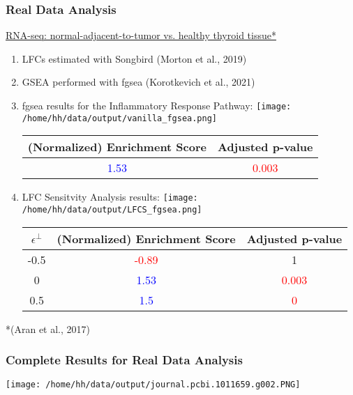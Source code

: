 \documentclass[11pt,t]{beamer}
\begin{document}
\begin{frame}
  \frametitle{Real Data Analysis}

  \underline{RNA-seq: normal-adjacent-to-tumor vs. healthy thyroid tissue*}
  \begin{enumerate}
    \item LFCs estimated with Songbird (Morton et al., 2019)
    \item GSEA performed with fgsea (Korotkevich et al., 2021)
  

  \pause

  \item fgsea results for the Inflammatory Response Pathway:
  \texttt{[image: /home/hh/data/output/vanilla\_fgsea.png]}
    \begin{center}
    \begin{tabular}{ |c|c| }
    \hline
    (Normalized) Enrichment Score & Adjusted p-value \\
    \hline
    \textcolor{blue}{1.53} & \textcolor{red}{0.003}  \\
    \hline
    \end{tabular}
    \end{center}
 
  \pause
  \item LFC Sensitvity Analysis results:
  \texttt{[image: /home/hh/data/output/LFCS\_fgsea.png]}
    \begin{center}
    \begin{tabular}{ |c|c|c| }
    \hline
    \(\epsilon^\perp\) & (Normalized) Enrichment Score & Adjusted p-value \\
    \hline
    -0.5 & \textcolor{red}{-0.89} & 1  \\
    \hline
    0 & \textcolor{blue}{1.53} & \textcolor{red}{0.003}  \\
    \hline
    0.5 & \textcolor{blue}{1.5} & \textcolor{red}{0}  \\
    \hline
    \end{tabular}
    \end{center}
   \end{enumerate} 
\tiny{*(Aran et al., 2017)}
\end{frame}

\begin{frame}
  \frametitle{Complete Results for Real Data Analysis}
  
  \texttt{[image: /home/hh/data/output/journal.pcbi.1011659.g002.PNG]}
\end{frame}
\end{document}
